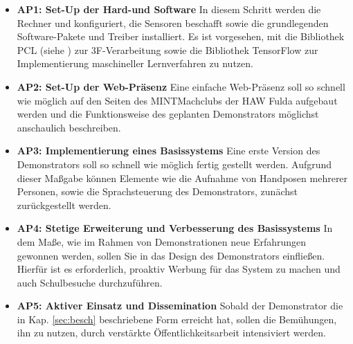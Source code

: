 \documentclass[11pt]{article}
\begin{document}
\begin{itemize}
\item \textbf {AP1: Set-Up der Hard-und Software} In diesem Schritt werden die Rechner und konfiguriert, die Sensoren beschafft sowie die grundlegenden Software-Pakete und Treiber installiert. Es ist vorgesehen, mit die Bibliothek PCL (siehe \cite{pcl}) zur 3F-Verarbeitung sowie die Bibliothek TensorFlow\cite{tf} zur Implementierung maschineller Lernverfahren zu nutzen.
\item \textbf {AP2: Set-Up der Web-Präsenz} Eine einfache Web-Präsenz soll so schnell wie möglich auf den Seiten des MINTMachclubs der HAW Fulda aufgebaut werden und die Funktionsweise des geplanten Demonstrators möglichst anschaulich beschreiben.
\item \textbf {AP3: Implementierung eines Basissystems} Eine erste Version des Demonstrators soll so schnell wie möglich fertig gestellt werden. Aufgrund dieser Maßgabe können Elemente wie die Aufnahme von Handposen mehrerer Personen, sowie die Sprachsteuerung des Demonstrators, zunächst zurückgestellt werden.
\item\textbf{AP4: Stetige Erweiterung und Verbesserung des Basissystems}
In dem Maße, wie im Rahmen von Demonstrationen neue Erfahrungen gewonnen werden, sollen Sie in das Design des Demonstrators einfließen. Hierfür ist es erforderlich, proaktiv Werbung für das System zu machen und auch Schulbesuche durchzuführen.
\item\textbf{AP5: Aktiver Einsatz und Dissemination}
Sobald der Demonstrator die in Kap. \ref{sec:besch} beschriebene Form erreicht hat, sollen die Bemühungen, ihn zu nutzen, durch verstärkte Öffentlichkeitsarbeit intensiviert werden.
\end{itemize}
%


%
\end{document}
